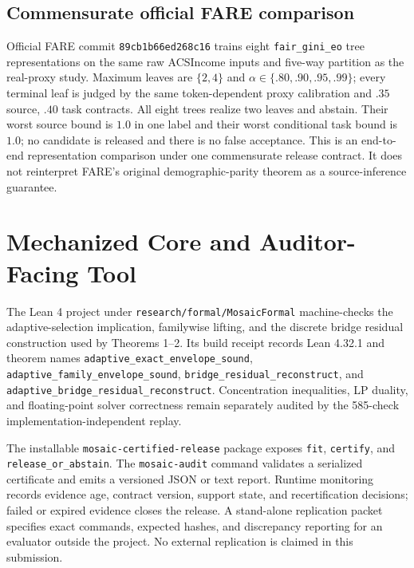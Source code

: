 \subsection{Commensurate official FARE comparison}

Official FARE commit
\texttt{89cb1b66ed268c16} trains eight \texttt{fair\_gini\_eo} tree
representations on the same raw ACSIncome inputs and five-way partition as the
real-proxy study. Maximum leaves are $\{2,4\}$ and
$\alpha\in\{.80,.90,.95,.99\}$; every terminal leaf is judged by the same
token-dependent proxy calibration and $.35$ source, $.40$ task contracts.
All eight trees realize two leaves and abstain. Their worst source bound is
$1.0$ in one label and their worst conditional task bound is $1.0$; no
candidate is released and there is no false acceptance. This is an end-to-end
representation comparison under one commensurate release contract. It does
not reinterpret FARE's original demographic-parity theorem as a
source-inference guarantee.

\section{Mechanized Core and Auditor-Facing Tool}

The Lean 4 project under \texttt{research/formal/MosaicFormal} machine-checks
the adaptive-selection implication, familywise lifting, and the discrete
bridge residual construction used by Theorems 1--2. Its build receipt records
Lean 4.32.1 and theorem names
\texttt{adaptive\_exact\_envelope\_sound},
\texttt{adaptive\_family\_envelope\_sound},
\texttt{bridge\_residual\_reconstruct}, and
\texttt{adaptive\_bridge\_residual\_reconstruct}. Concentration inequalities,
LP duality, and floating-point solver correctness remain separately audited by
the 585-check implementation-independent replay.

The installable \texttt{mosaic-certified-release} package exposes
\texttt{fit}, \texttt{certify}, and \texttt{release\_or\_abstain}. The
\texttt{mosaic-audit} command validates a serialized certificate and emits a
versioned JSON or text report. Runtime monitoring records evidence age,
contract version, support state, and recertification decisions; failed or
expired evidence closes the release. A stand-alone replication packet specifies
exact commands, expected hashes, and discrepancy reporting for an evaluator
outside the project. No external replication is claimed in this submission.
